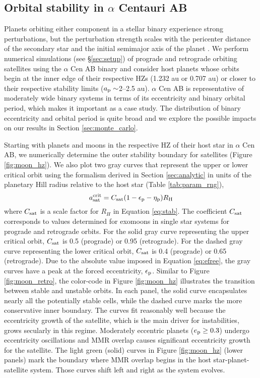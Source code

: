 \documentclass[preprint]{aastex63}
\begin{document}
\subsection{Orbital stability in $\alpha$ Centauri AB} \label{sec:orb_stab}
Planets orbiting either component in a stellar binary experience strong perturbations, but the perturbation strength scales with the pericenter distance of the secondary star and the initial semimajor axis of the planet \citep[e.g.,][]{David2003,Quarles2018}.  We perform numerical simulations (see \S\ref{sec:setup}) of prograde and retrograde orbiting satellites using the $\alpha$ Cen AB binary and consider host planets whose orbits begin at the inner edge of their respective HZs (1.232 au or 0.707 au) or closer to their respective stability limits ($a_{\rm p}\sim$2--2.5 au).  $\alpha$ Cen AB is representative of moderately wide binary systems \citep{Raghavan2010,Moe2017} in terms of its eccentricity and binary orbital period, which makes it important as a case study.  The distribution of binary eccentricity and orbital period is quite broad and we explore the possible impacts on our results in Section \ref{sec:monte_carlo}.

Starting with planets and moons in the respective HZ of their host star in $\alpha$ Cen AB, we numerically determine the outer stability boundary for satellites (Figure \ref{fig:moon_hz}).  We also plot two gray curves that represent the upper or lower critical orbit using the formalism derived in Section \ref{sec:analytic} in units of the planetary Hill radius relative to the host star (Table \ref{tab:param_rng}),
\begin{equation} \label{eq:bin_stab}
    a_{\rm sat}^{\rm crit} = C_{\rm sat}(1-\epsilon_{\rm p} - \eta_{\rm p}) R_{\rm H}
\end{equation}
where $C_{\rm sat}$ is a scale factor for $R_H$ in Equation \ref{eq:stab}. The coefficient $C_{\rm sat}$ corresponds to values determined for exomoons in single star systems \citep{Domingos2006,Rosario-Franco2020} for prograde and retrograde orbits.  For the solid gray curve representing the upper critical orbit, $C_{ \rm sat}$ is 0.5 (prograde) or 0.95 (retrograde).  For the dashed gray curve representing the lower critical orbit, $C_{\rm sat}$ is 0.4 (prograde) or 0.65 (retrograde).  {Due to the absolute value imposed in {Equation \ref{eq:efree}}, the gray curves have a peak at the forced eccentricity, $\epsilon_{\rm p}$.}  Similar to Figure \ref{fig:moon_retro}, the color-code in Figure \ref{fig:moon_hz} illustrates the transition between stable and unstable orbits.  In each panel, the solid curve encapsulates nearly all the potentially stable cells, while the dashed curve marks the more conservative inner boundary.  The curves fit reasonably well because the eccentricity growth of the satellite, which is the main driver for instabilities, grows secularly in this regime.  Moderately eccentric planets ($e_{\rm p} \geq 0.3$) undergo eccentricity oscillations and MMR overlap causes significant eccentricity growth for the satellite.  The light green (solid) curves in Figure \ref{fig:moon_hz} (lower panels) mark the boundary where MMR overlap begins in the host star-planet-satellite system. Those curves shift left and right as the system evolves. 
\end{document}
